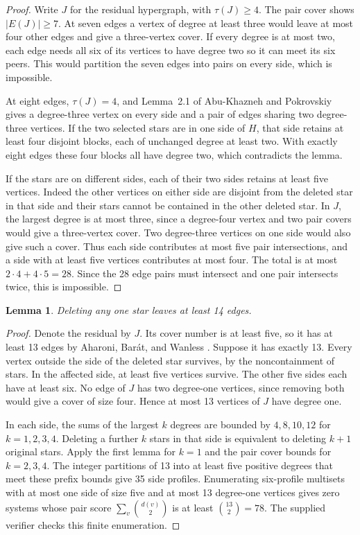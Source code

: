 \documentclass[10pt]{article}
\newtheorem{lemma}{Lemma}
\begin{document}
\begin{proof}
Write $J$ for the residual hypergraph, with $\tau(J)\geq4$.
The pair cover shows $|E(J)|\geq7$. At seven edges a vertex of degree at
least three would leave at most four other edges and give a three-vertex
cover. If every degree is at most two, each edge needs all six of its
vertices to have degree two so it can meet its six peers. This would
partition the seven edges into pairs on every side, which is impossible.

At eight edges, $\tau(J)=4$, and Lemma~2.1 of Abu-Khazneh and Pokrovskiy
\cite{akp} gives a degree-three vertex on every side and a pair of edges
sharing two degree-three vertices. If the two selected stars are in one
side of $H$, that side retains at least four disjoint blocks, each of
unchanged degree at least two. With exactly eight edges these four blocks
all have degree two, which contradicts the lemma.

If the stars are on different sides, each of their two sides retains at
least five vertices. Indeed the other vertices on either side are
disjoint from the deleted star in that side and their stars cannot be
contained in the other deleted star. In $J$, the largest degree is at most
three, since a degree-four vertex and two pair covers would give a
three-vertex cover. Two degree-three vertices on one side would also give
such a cover. Thus each side contributes at most five pair intersections,
and a side with at least five vertices contributes at most four. The total
is at most $2\cdot4+4\cdot5=28$. Since the 28 edge pairs must intersect
and one pair intersects twice, this is impossible.
\end{proof}

\begin{lemma}
Deleting any one star leaves at least 14 edges.
\end{lemma}

\begin{proof}
Denote the residual by $J$. Its cover number is at least five, so it has
at least 13 edges by Aharoni, Bar\'at, and Wanless \cite[Theorem~2.7]{abw}.
Suppose it has exactly 13.
Every vertex outside the side of the deleted star survives, by the
noncontainment of stars. In the affected side, at least five vertices
survive. The other five sides each have at least six. No edge of $J$
has two degree-one vertices, since removing both would give a cover
of size four. Hence at most 13 vertices of $J$ have degree one.

In each side, the sums of the largest $k$ degrees are bounded by
$4,8,10,12$ for $k=1,2,3,4$. Deleting a further $k$ stars in that
side is equivalent to deleting $k+1$ original stars. Apply the first
lemma for $k=1$ and the pair cover bounds for $k=2,3,4$.
The integer partitions of 13 into at least five positive degrees
that meet these prefix bounds give 35 side profiles. Enumerating
six-profile multisets with at most one side of size five and at most
13 degree-one vertices gives zero systems whose pair score
$\sum_v\binom{d(v)}2$ is at least $\binom{13}2=78$.
The supplied verifier checks this finite enumeration.
\end{proof}
\end{document}
